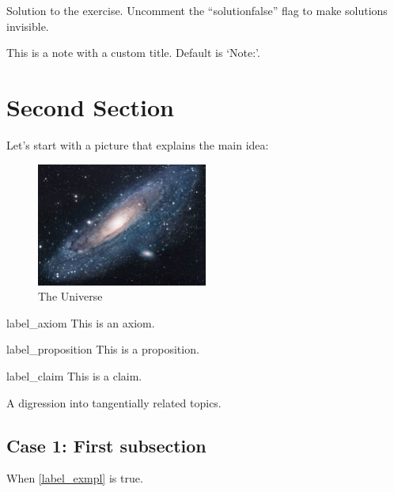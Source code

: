 \begin{solution}
	Solution to the exercise. Uncomment the ``solutionfalse'' flag to make solutions invisible.
\end{solution}


\begin{note}
	This is a note with a custom title. Default is `Note:'.
\end{note}



\section{Second Section}

Let's start with a picture that explains the main idea:
\begin{figure}[!ht]
    \centering
    \includegraphics[width=0.5\textwidth]{images/universe.jpg}
    \caption{The Universe}
    \label{fig:universe}
\end{figure}


\begin{axiom}{label_axiom}
	This is an axiom.
\end{axiom}

\begin{prop}{label_proposition}
	This is a proposition.
\end{prop}

\begin{claim}{label_claim}
	This is a claim.
\end{claim}

\begin{digression}
	A digression into tangentially related topics.
\end{digression}



\subsection{Case 1: First subsection}
When  \cref{label_exmpl} is true.
\begin{warning}[A Warning:] %
	\lipsum[1][1-2]
\end{warning}


